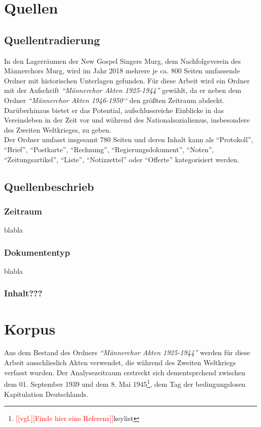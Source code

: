 \documentclass[12pt, a4paper, ngerman, bidi=default]{article}
\begin{document}
\section{Quellen}
\subsection{Quellentradierung}
In den Lagerräumen der New Gospel Singers Murg, dem Nachfolgeverein des Männerchors Murg, 
wird im Jahr 2018 mehrere je ca. 800 Seiten umfassende Ordner mit historischen Unterlagen gefunden. 
Für diese Arbeit wird ein Ordner mit der Aufschrift \textit{``Männerchor Akten 1925-1944''} gewählt, da er neben dem Ordner 
\textit{``Männerchor Akten 1946-1950‘‘} den größten Zeitraum abdeckt. Darüberhinaus bietet er das Potential, aufschlussreiche Einblicke in das Vereinsleben
in der Zeit vor und während des Nationalsozialismus, insbesondere des Zweiten Weltkrieges, zu geben.\\ 
Der Ordner umfasst insgesamt 780 Seiten und deren Inhalt kann als ``Protokoll'', ``Brief'', ``Postkarte'', ``Rechnung'', 
``Regierungsdokument'', ``Noten'', ``Zeitungsartikel'', ``Liste'', ``Notizzettel'' oder ``Offerte'' kategorisiert werden.


\subsection{Quellenbeschrieb}


\subsubsection{Zeitraum}
blabla
\subsubsection{Dokumententyp}
blabla
\subsubsection{Inhalt???}

\section{Korpus}
Aus dem Bestand des Ordners \textit{``Männerchor Akten 1925-1944''} werden für diese Arbeit ausschlieslich Akten verwendet, 
die während des Zweiten Weltkriegs verfasst wurden. Der Analysezeitraum erstreckt sich dementsprchend zwischen dem 01. September 1939 
und dem 8. Mai 1945\footnote{\textcolor{red}{[[vgl.][Finde hier eine Referenz]]}{keylist}}, dem Tag der bedingungslosen Kapitulation Deutschlands.
\end{document}
